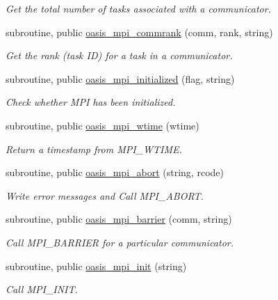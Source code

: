 \begin{DoxyCompactItemize}
\begin{DoxyCompactList}\small\item\em Get the total number of tasks associated with a communicator. \end{DoxyCompactList}\item 
subroutine, public \hyperlink{namespacemod__oasis__mpi_a2690a841a331f4398cc4b5a244bbc52e}{oasis\+\_\+mpi\+\_\+commrank} (comm, rank, string)
\begin{DoxyCompactList}\small\item\em Get the rank (task ID) for a task in a communicator. \end{DoxyCompactList}\item 
subroutine, public \hyperlink{namespacemod__oasis__mpi_a384f170e63ac03f25d3bd549245b43f3}{oasis\+\_\+mpi\+\_\+initialized} (flag, string)
\begin{DoxyCompactList}\small\item\em Check whether M\+PI has been initialized. \end{DoxyCompactList}\item 
subroutine, public \hyperlink{namespacemod__oasis__mpi_aa3786c2cab131c3834583e7943ba28c8}{oasis\+\_\+mpi\+\_\+wtime} (wtime)
\begin{DoxyCompactList}\small\item\em Return a timestamp from M\+P\+I\+\_\+\+W\+T\+I\+ME. \end{DoxyCompactList}\item 
subroutine, public \hyperlink{namespacemod__oasis__mpi_a5b21b6d8732d5f7b70d8b20cefe0072f}{oasis\+\_\+mpi\+\_\+abort} (string, rcode)
\begin{DoxyCompactList}\small\item\em Write error messages and Call M\+P\+I\+\_\+\+A\+B\+O\+RT. \end{DoxyCompactList}\item 
subroutine, public \hyperlink{namespacemod__oasis__mpi_aaf477847380fbbbc1341520b0b3e66da}{oasis\+\_\+mpi\+\_\+barrier} (comm, string)
\begin{DoxyCompactList}\small\item\em Call M\+P\+I\+\_\+\+B\+A\+R\+R\+I\+ER for a particular communicator. \end{DoxyCompactList}\item 
subroutine, public \hyperlink{namespacemod__oasis__mpi_aaf45f20e0000b32e71ec9ea8e806f57c}{oasis\+\_\+mpi\+\_\+init} (string)
\begin{DoxyCompactList}\small\item\em Call M\+P\+I\+\_\+\+I\+N\+IT. \end{DoxyCompactList}\item 

\end{DoxyCompactItemize}
